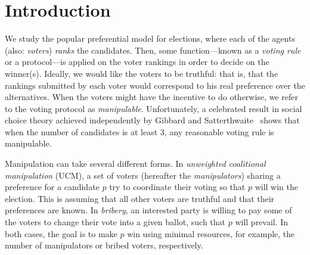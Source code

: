 \documentclass[letterpaper]{article} %
\theoremstyle{definition}
\begin{document}
\section{Introduction}	
We study the popular preferential model for elections, where each of the agents (also:  \emph{voters})  \emph{ranks} the candidates. Then, some function---known as a \emph{voting rule} or a protocol---is applied on the voter rankings in order to decide on the winner(s). Ideally, we would like the voters to be truthful: that is, that the rankings submitted by each voter would correspond to his real preference over the alternatives. When the voters might have the incentive to do otherwise, we refer to the voting protocol as \emph{manipulable}. Unfortunately, a celebrated result in social choice theory achieved independently by Gibbard and Satterthwaite~\cite{gibbard1973manipulation,satterthwaite1975strategy} shows that when the number of candidates is at least $3$, any reasonable voting rule  is manipulable. 

Manipulation can take several different forms. In \emph{unweighted  coalitional manipulation} (UCM), a set of voters (hereafter the \emph{manipulators}) sharing a preference for a candidate $p$  try to coordinate their voting so that $p$ will win the election. This is assuming that all other voters are truthful and that their preferences are known. 
In \emph{bribery}, an interested party is willing to pay some of the voters to change their vote into a given ballot, such that $p$ will prevail. 
In both cases, the goal is to make $p$ win using minimal resources, for example, the number of manipulators or bribed voters, respectively. 
\end{document}
